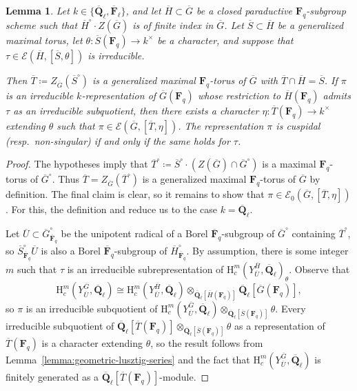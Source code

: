 \documentclass[reqno]{amsart}
\numberwithin{equation}{subsection}
\newcommand{\F}{\mathbf{F}}
\newcommand{\Q}{\mathbf{Q}}
\newcommand{\ol}[1]{\overline{#1}}
\newcommand{\co}{\colon}
\newcommand\cE{\mathcal{E}}
\newcommand{\rH}{\ensuremath{\mathrm{H}}\xspace}
\newtheorem{lemma}[thm]{Lemma}
\theoremstyle{remark}
\numberwithin{equation}{subsection}
\numberwithin{figure}{subsection}
\begin{document}
\begin{lemma}\label{lemma:paraductive-series-extension}
Let $k \in \{\ol\Q_\ell,\ol\F_\ell\}$, and let $\ol H\subset\ol G$ be a closed paraductive $\F_q$-subgroup scheme such that $\ol H^\circ \cdot Z(\ol G)$ is of finite index in $\ol G$. Let $\ol S \subset \ol H$ be a generalized maximal torus, let $\theta\co \ol S(\F_q)\to k^\times$ be a character, and suppose that $\tau\in\cE(\ol H,[\ol S,\theta])$ is irreducible.

Then $\ol T \coloneqq Z_{\ol G}(\ol S^\circ)$ is a generalized maximal $\F_q$-torus of $\ol G$ with $\ol T\cap\ol H=\ol S$. If $\pi$ is an irreducible $k$-representation of $\ol G(\F_q)$ whose restriction to $\ol H(\F_q)$ admits $\tau$ as an irreducible subquotient, then there exists a character $\eta\co\ol T(\F_q)\to k^\times$ extending $\theta$ such that $\pi\in\cE(\ol G,[\ol T,\eta])$. The representation $\pi$ is cuspidal (resp.\ non-singular) if and only if the same holds for $\tau$.
\end{lemma}

\begin{proof}
The hypotheses imply that $\ol T^\circ \coloneqq \ol S^\circ \cdot (Z(\ol G) \cap \ol G^\circ)$ is a maximal $\F_q$-torus of $\ol G^\circ$. Thus $\ol T = Z_{\ol G}(\ol T^\circ)$ is a generalized maximal $\F_q$-torus of $\ol G$ by definition. The final claim is clear, so it remains to show that $\pi \in \cE_0(\ol G, [\ol T, \eta])$. For this, the definition and \cite[Part III, no.\ 16.1, Theorem~33]{Serre77} reduce us to the case $k = \ol\Q_\ell$.

Let $\ol U \subset \ol G^\circ_{\ol\F_q}$ be the unipotent radical of a Borel $\ol\F_q$-subgroup of $\ol G^\circ$ containing $\ol T^\circ$, so $\ol S^\circ_{\ol\F_q} \ol U$ is also a Borel $\ol\F_q$-subgroup of $\ol H^\circ_{\ol\F_q}$. By assumption, there is some integer $m$ such that $\tau$ is an irreducible subrepresentation of $\rH^m_c(Y_{\ol U}^{\ol H}, \ol\Q_\ell)_\theta$. Observe that 
\[
\rH^m_c(Y_{\ol U}^{\ol G}, \ol\Q_\ell) \cong \rH^m_c(Y_{\ol U}^{\ol H}, \ol\Q_\ell) \otimes_{\ol\Q_\ell[\ol H(\F_q)]} \ol\Q_\ell[\ol G(\F_q)],
\]
so $\pi$ is an irreducible subquotient of $\rH_c^m(Y_{\ol U}^{\ol G}, \ol\Q_\ell) \otimes_{\ol\Q_\ell[\ol S(\F_q)]} \theta$. Every irreducible subquotient of $\ol\Q_\ell[\ol T(\F_q)] \otimes_{\ol\Q_\ell[\ol S(\F_q)]} \theta$ as a representation of $\ol T(\F_q)$ is a character extending $\theta$, so the result follows from Lemma~\ref{lemma:geometric-lusztig-series} and the fact that $\rH_c^m(Y_{\ol U}^{\ol G}, \ol\Q_\ell)$ is finitely generated as a $\ol\Q_\ell[\ol T(\F_q)]$-module.
\end{proof}
\end{document}
